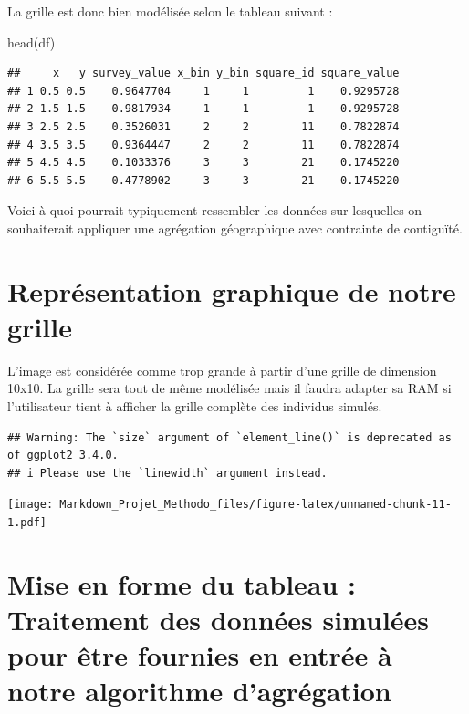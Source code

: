 \documentclass[
]{article}
\newenvironment{Shaded}{\begin{snugshade}}{\end{snugshade}}
\newcommand{\FunctionTok}[1]{\textcolor[rgb]{0.00,0.00,0.00}{#1}}
\newcommand{\NormalTok}[1]{#1}
\begin{document}
La grille est donc bien modélisée selon le tableau suivant :

\begin{Shaded}
\begin{Highlighting}[]
\FunctionTok{head}\NormalTok{(df)}
\end{Highlighting}
\end{Shaded}

\begin{verbatim}
##     x   y survey_value x_bin y_bin square_id square_value
## 1 0.5 0.5    0.9647704     1     1         1    0.9295728
## 2 1.5 1.5    0.9817934     1     1         1    0.9295728
## 3 2.5 2.5    0.3526031     2     2        11    0.7822874
## 4 3.5 3.5    0.9364447     2     2        11    0.7822874
## 5 4.5 4.5    0.1033376     3     3        21    0.1745220
## 6 5.5 5.5    0.4778902     3     3        21    0.1745220
\end{verbatim}

Voici à quoi pourrait typiquement ressembler les données sur lesquelles
on souhaiterait appliquer une agrégation géographique avec contrainte de
contiguïté.

\hypertarget{repruxe9sentation-graphique-de-notre-grille}{%
\section{Représentation graphique de notre
grille}\label{repruxe9sentation-graphique-de-notre-grille}}

L'image est considérée comme trop grande à partir d'une grille de
dimension 10x10. La grille sera tout de même modélisée mais il faudra
adapter sa RAM si l'utilisateur tient à afficher la grille complète des
individus simulés.

\begin{verbatim}
## Warning: The `size` argument of `element_line()` is deprecated as of ggplot2 3.4.0.
## i Please use the `linewidth` argument instead.
\end{verbatim}

\texttt{[image: Markdown\_Projet\_Methodo\_files/figure-latex/unnamed-chunk-11-1.pdf]}

\hypertarget{mise-en-forme-du-tableau-traitement-des-donnuxe9es-simuluxe9es-pour-uxeatre-fournies-en-entruxe9e-uxe0-notre-algorithme-dagruxe9gation}{%
\section{Mise en forme du tableau : Traitement des données simulées pour
être fournies en entrée à notre algorithme
d'agrégation}\label{mise-en-forme-du-tableau-traitement-des-donnuxe9es-simuluxe9es-pour-uxeatre-fournies-en-entruxe9e-uxe0-notre-algorithme-dagruxe9gation}}
\end{document}

